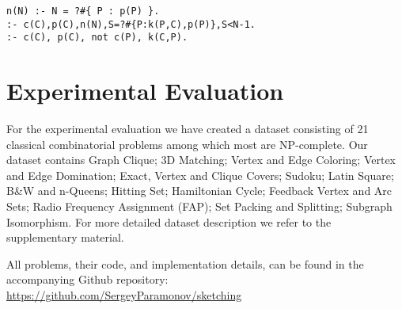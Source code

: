 \begin{Verbatim}[fontsize=\small]
n(N) :- N = ?#{ P : p(P) }.
:- c(C),p(C),n(N),S=?#{P:k(P,C),p(P)},S<N-1.
:- c(C), p(C), not c(P), k(C,P).
\end{Verbatim} 


\section{Experimental Evaluation}\label{sec:experiments} 




For the experimental evaluation we have created a dataset consisting 
of 21 classical combinatorial problems among which most are NP-complete. 
Our dataset contains Graph Clique; 3D Matching; Vertex and Edge Coloring; Vertex and Edge Domination; Exact, Vertex and Clique Covers; Sudoku; Latin Square; B\&W and n-Queens; Hitting Set; Hamiltonian Cycle; Feedback Vertex and Arc Sets; Radio Frequency Assignment (FAP); Set Packing and Splitting; Subgraph Isomorphism. For more detailed dataset description we refer to the supplementary material.

All problems, their code, and implementation details, can be found in the accompanying Github repository:\\
{\small\url{https://github.com/SergeyParamonov/sketching}}

